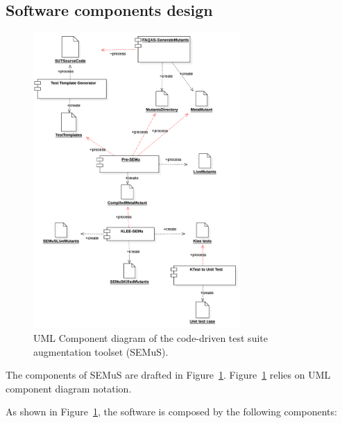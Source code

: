 \subsection{Software components design}

\begin{figure}[tb]
  \centering
  \includegraphics[width=0.7\textwidth]{images/semus-component.pdf}
      \caption{UML Component diagram of the code-driven test suite augmentation toolset (SEMuS).}
      \label{fig:component_diagram_semus}
\end{figure}


The components of SEMuS are drafted in Figure~\ref{fig:component_diagram_semus}. Figure~\ref{fig:component_diagram_semus} relies on UML component diagram notation.

As shown in Figure~\ref{fig:component_diagram_semus}, the software is composed by the following components:

